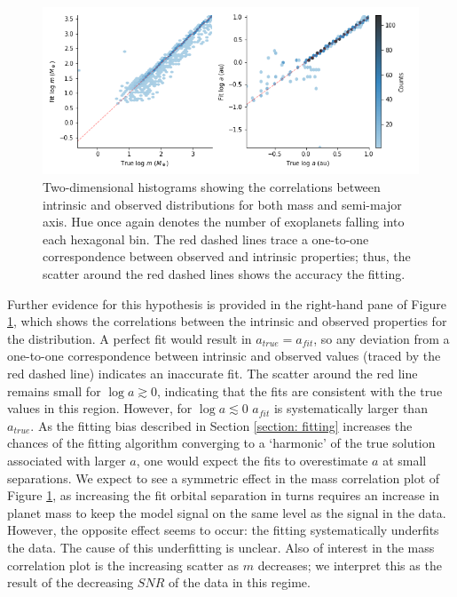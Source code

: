 \documentclass[12pt,manuscript]{aastex}
\begin{document}
\begin{figure}[ht]
  \centering
  \includegraphics[width=0.9\linewidth]{../figures/planets3_correlations}
  \caption{Two-dimensional histograms showing the correlations between intrinsic and observed distributions for both mass and semi-major axis. 
  Hue once again denotes the number of exoplanets falling into each hexagonal bin.
  The red dashed lines trace a one-to-one correspondence between observed and intrinsic properties; thus, the scatter around the red dashed lines shows the accuracy the fitting.}
  \label{fig: correlations}
\end{figure}


Further evidence for this hypothesis is provided in the right-hand pane of Figure \ref{fig: correlations}, which shows the correlations between the intrinsic and observed properties for the distribution.
A perfect fit would result in $a_{true} = a_{fit}$, so any deviation from a one-to-one correspondence  between intrinsic and observed values (traced by the red dashed line) indicates an inaccurate fit.
The scatter around the red line remains small for $\log a \gtrsim 0$, indicating that the fits are consistent with the true values in this region. 
However, for $\log a \lesssim 0$ $a_{fit}$ is systematically larger than $a_{true}$.
As the fitting bias described in Section \ref{section: fitting} increases the chances of the fitting algorithm converging to a `harmonic' of the true solution associated with larger $a$, one would expect the fits to overestimate $a$ at small separations.
We expect to see a symmetric effect in the mass correlation plot of Figure \ref{fig: correlations}, as increasing the fit orbital separation in turns requires an increase in planet mass to keep the model signal on the same level as the signal in the data.
However, the opposite effect seems to occur: the fitting systematically underfits the data.
The cause of this underfitting is unclear.
Also of interest in the mass correlation plot is the increasing scatter as $m$ decreases; we interpret this as the result of the decreasing $SNR$ of the data in this regime.
\end{document}
